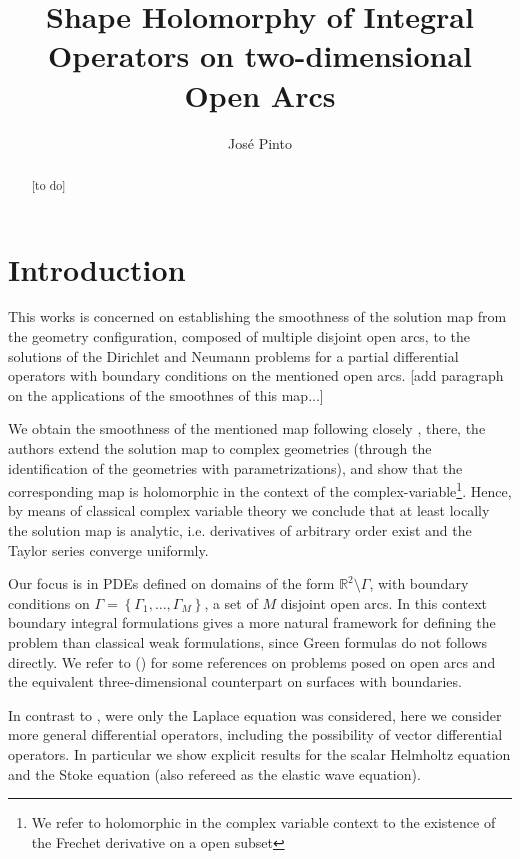 \documentclass{article}
\title{Shape Holomorphy of Integral Operators on two-dimensional Open Arcs}
\author{Jos\'e Pinto}
\newcommand{\todo}[1]{{\color{red}[#1]}}
\newcommand{\IR}{{\mathbb R}}
\begin{document}
\maketitle

\begin{abstract}
\todo{to do}
\end{abstract}

\section{Introduction}
This works is concerned on establishing the smoothness of the solution map from the geometry configuration, composed of multiple disjoint open arcs, to the solutions of the Dirichlet and Neumann problems for a partial differential operators with boundary conditions on the mentioned open arcs. 
\todo{add paragraph on the applications of the smoothnes of this map...}

We obtain the smoothness of the mentioned map following closely \cite{Henriquez2021}, there, the authors extend the solution map to complex geometries (through the identification of the geometries with parametrizations), and show that the corresponding map is holomorphic in the context of the complex-variable\footnote{We refer to holomorphic in the complex variable context to the existence of the Frechet derivative on a open subset}. Hence, by means of classical complex variable theory we conclude that at least locally the solution map is analytic, i.e. derivatives of arbitrary order exist and the Taylor series converge uniformly. 

Our focus is in PDEs defined on domains of the form $\IR^2 \setminus \Gamma$, with boundary conditions on $\Gamma = \left\lbrace \Gamma_1, \hdots, \Gamma_M \right\rbrace$, a set of $M$ disjoint open arcs. In this context boundary integral formulations gives a more  natural framework for defining the problem than classical weak formulations, since Green formulas do not follows directly. We refer to (\cite{stephane,stephan1984augmented,STE86,Stephan1987,sloan1991,JEREZHANCKES2011547,JHP20,Averseng2019,kress1996,kress2000}) for some references on problems posed on open arcs and the equivalent three-dimensional counterpart on surfaces with boundaries.  

In contrast to \cite{Henriquez2021}, were only the Laplace equation was considered, here we consider more general differential operators, including the possibility of vector differential operators. In particular we show explicit results for the scalar Helmholtz equation and the Stoke equation (also refereed as the elastic wave equation). 
\end{document}
